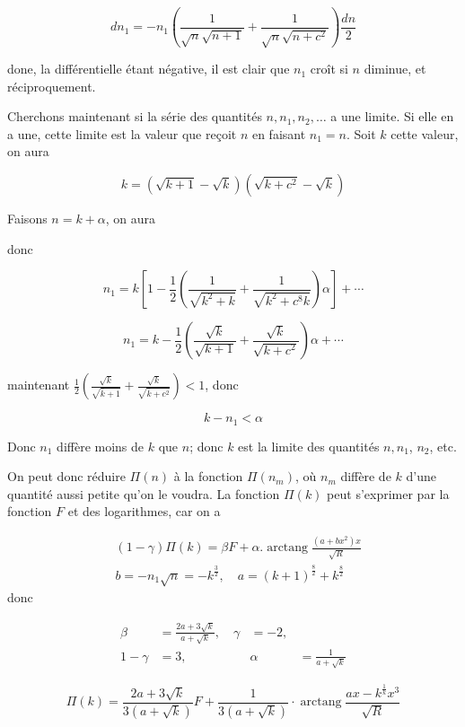 \documentclass{article}
\begin{document}
\[
d n_{1}=-n_{1}\left(\frac{1}{\sqrt{n} \sqrt{n+1}}+\frac{1}{\sqrt{n} \sqrt{n+c^{2}}}\right) \frac{d n}{2}
\]

done, la différentielle étant négative, il est clair que \(n_{1}\) croît si \(n\) diminue, et réciproquement.

Cherchons maintenant si la série des quantités \(n, n_{1}, n_{2}, \ldots\) a une limite. Si elle en a une, cette limite est la valeur que reçoit \(n\) en faisant \(n_{1}=n\). Soit \(k\) cette valeur, on aura

\[
k=(\sqrt{k+1}-\sqrt{k})\left(\sqrt{k+c^{2}}-\sqrt{k}\right)
\]

Faisons \(n=k+\alpha\), on aura

donc

\[
n_{1}=k\left[1-\frac{1}{2}\left(\frac{1}{\sqrt{k^{2}+k}}+\frac{1}{\sqrt{k^{2}+c^{8} k}}\right) \alpha\right]+\cdots
\]

\[
n_{1}=k-\frac{1}{2}\left(\frac{\sqrt{k}}{\sqrt{k+1}}+\frac{\sqrt{k}}{\sqrt{k+c^{2}}}\right) \alpha+\cdots
\]

maintenant \(\frac{1}{2}\left(\frac{\sqrt{k}}{\sqrt{\bar{k}+1}}+\frac{\sqrt{k}}{\sqrt{\bar{k}+c^{2}}}\right)<1\), donc

\[
k-n_{1}<\alpha
\]

Donc \(n_{1}\) diffère moins de \(k\) que \(n\); donc \(k\) est la limite des quantités \(n, n_{1}\), \(n_{2}\), etc.

On peut donc réduire \(\Pi(n)\) à la fonction \(\Pi\left(n_{m}\right)\), où \(n_{m}\) diffère de \(k\) d'une quantité aussi petite qu'on le voudra. La fonction \(\Pi(k)\) peut s'exprimer par la fonction \(F\) et des logarithmes, car on a

\[
\begin{aligned}
& (1-\gamma) \Pi(k)=\beta F+\alpha . \operatorname{arctang} \frac{\left(a+b x^{2}\right) x}{\sqrt{R}} \\
& b=-n_{1} \sqrt{n}=-k^{\frac{3}{2}}, \quad a=(k+1)^{\frac{8}{2}}+k^{\frac{8}{2}}
\end{aligned}
\]
donc

\[
\begin{array}{rlrl}
\beta & =\frac{2 a+3 \sqrt{k}}{a+\sqrt{k}}, \quad \gamma & =-2, \\
1-\gamma & =3, & \alpha & =\frac{1}{a+\sqrt{k}}
\end{array}
\]

\[
\Pi(k)=\frac{2 a+3 \sqrt{k}}{3(a+\sqrt{k})} F+\frac{1}{3(a+\sqrt{k})} \cdot \operatorname{arctang} \frac{a x-k^{\frac{1}{k}} x^{3}}{\sqrt{R}}
\]
\end{document}
